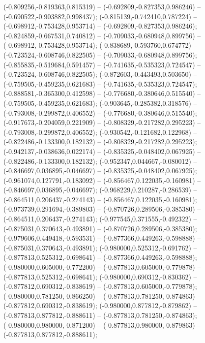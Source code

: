  (-0.809256,-0.819363,0.815319) -- (-0.692809,-0.827353,0.986246) -- (-0.690522,-0.903882,0.998437);
 (-0.815139,-0.742410,0.787224) -- (-0.698912,-0.753428,0.953714) -- (-0.692809,-0.827353,0.986246);
 (-0.824859,-0.667531,0.740812) -- (-0.709033,-0.680948,0.899756) -- (-0.698912,-0.753428,0.953714);
 (-0.838689,-0.593760,0.674772) -- (-0.723524,-0.608746,0.822505) -- (-0.709033,-0.680948,0.899756);
 (-0.855835,-0.519684,0.591457) -- (-0.741635,-0.535323,0.724547) -- (-0.723524,-0.608746,0.822505);
 (-0.872603,-0.443493,0.503650) -- (-0.759505,-0.459235,0.621683) -- (-0.741635,-0.535323,0.724547);
 (-0.888581,-0.365300,0.412598) -- (-0.776680,-0.380646,0.515540) -- (-0.759505,-0.459235,0.621683);
 (-0.903645,-0.285382,0.318576) -- (-0.793008,-0.299872,0.406552) -- (-0.776680,-0.380646,0.515540);
 (-0.917673,-0.204059,0.221909) -- (-0.808329,-0.217282,0.295223) -- (-0.793008,-0.299872,0.406552);
 (-0.930542,-0.121682,0.122968) -- (-0.822486,-0.133300,0.182132) -- (-0.808329,-0.217282,0.295223);
 (-0.942137,-0.038636,0.022174) -- (-0.835325,-0.048402,0.067925) -- (-0.822486,-0.133300,0.182132);
 (-0.952347,0.044667,-0.080012) -- (-0.846697,0.036895,-0.046697) -- (-0.835325,-0.048402,0.067925);
 (-0.961074,0.127791,-0.183092) -- (-0.856467,0.122035,-0.160981) -- (-0.846697,0.036895,-0.046697);
 (-0.968229,0.210287,-0.286539) -- (-0.864511,0.206437,-0.274143) -- (-0.856467,0.122035,-0.160981);
 (-0.973739,0.291694,-0.389803) -- (-0.870726,0.289506,-0.385380) -- (-0.864511,0.206437,-0.274143);
 (-0.977545,0.371555,-0.492322) -- (-0.875031,0.370643,-0.493891) -- (-0.870726,0.289506,-0.385380);
 (-0.979606,0.449418,-0.593531) -- (-0.877366,0.449263,-0.598888) -- (-0.875031,0.370643,-0.493891);
 (-0.980000,0.525312,-0.691762) -- (-0.877813,0.525312,-0.698641) -- (-0.877366,0.449263,-0.598888);
 (-0.980000,0.605000,-0.772200) -- (-0.877813,0.605000,-0.779878) -- (-0.877813,0.525312,-0.698641);
 (-0.980000,0.690312,-0.830362) -- (-0.877812,0.690312,-0.838619) -- (-0.877813,0.605000,-0.779878);
 (-0.980000,0.781250,-0.866250) -- (-0.877813,0.781250,-0.874863) -- (-0.877812,0.690312,-0.838619);
 (-0.980000,0.877812,-0.879862) -- (-0.877813,0.877812,-0.888611) -- (-0.877813,0.781250,-0.874863);
 (-0.980000,0.980000,-0.871200) -- (-0.877813,0.980000,-0.879863) -- (-0.877813,0.877812,-0.888611);
